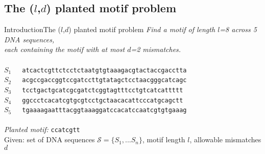 \documentclass[pdf,xcolor={dvipsnames}]{beamer}
\begin{document}
	\subsection{The ($l$,$d$) planted motif problem}
	\begin{frame}{Introduction}{The ($l$,$d$) planted motif problem}
		\centering
		\emph{Find a motif of length $l$=8 across 5 DNA sequences,}\\
		\emph{each containing the motif with at most $d$=2 mismatches.}\\
		\ \\
		\footnotesize
		$S_1$\ \ \  \texttt{at{\color{blue}c{ac}tcgtt}ctcctctaatgtgtaaagacgtactaccgacctta}\\
		$S_2$\ \ \  \texttt{acgccgaccggtc{\color{blue}c{g}atc{c}tt}gtatagctcctaacgggcatcagc}\\
		$S_3$\ \ \  \texttt{tcctgactgcatcgcgatctcggtagtttcctgt{\color{blue}{t}catc{a}tt}ttt}\\
		$S_4$\ \ \  \texttt{ggccctca{\color{blue}{g}catcgt{g}}cgtcctgctaacacattcccatgcagctt}\\
		$S_5$\ \ \  \texttt{tgaaaagaatttacggtaaaggatccacatc{\color{blue}c{a}atcgt{g}}tgaaag}\\ 
		\ \\
		\emph{Planted motif: }\texttt{\color{blue}ccatcgtt}\\

		Given: set of DNA sequences $\mathcal{S} = \{S_{1},...S_{n}\}$, motif length $l$, allowable mismatches $d$
		
		\end{frame}
\end{document}
